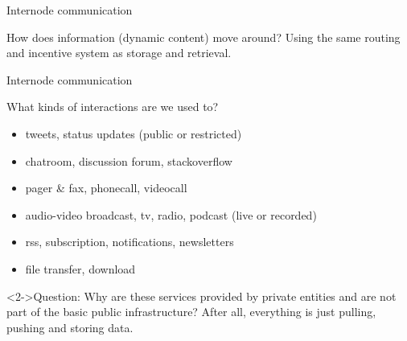 

\begin{subsection}{Internode communication}

\begin{frame}
 \begin{block}{How does information (dynamic content) move around?}
 Using the same routing and incentive system as storage and retrieval.
 \end{block}
\end{frame}


\begin{frame}{Internode communication}
\begin{block}{What kinds of interactions are we used to?}
 \begin{itemize}
    \item tweets, status updates (public or restricted)
    \item chatroom, discussion forum, stackoverflow
    \item pager \& fax, phonecall, videocall
    \item audio-video broadcast, tv, radio, podcast (live or recorded)
    \item rss, subscription, notifications, newsletters
    \item file transfer, download
 \end{itemize}
\end{block}
\begin{block}<2->{Question:}
 Why are these services provided by private entities and are not part of the basic public infrastructure? After all, everything is just pulling, pushing and storing data.
\end{block}
\end{frame}


\end{subsection}
